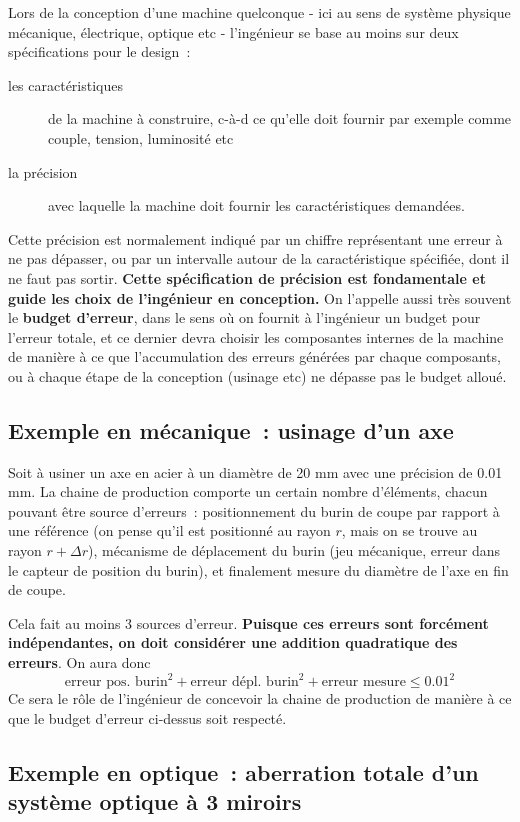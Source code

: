 Lors de la conception d'une machine quelconque - ici au sens de système physique mécanique, électrique, optique etc - l'ingénieur se base au moins sur deux spécifications pour le design~:
\begin{description}
\item[les caractéristiques] de la machine à construire, c-à-d ce qu'elle doit fournir par exemple comme couple, tension, luminosité etc
\item[la précision] avec laquelle la machine doit fournir les caractéristiques demandées.
\end{description}
Cette précision est normalement indiqué par un chiffre représentant une erreur à ne pas dépasser, ou par un intervalle autour de la caractéristique spécifiée, dont il ne faut pas sortir. \textbf{Cette spécification de précision est fondamentale et guide les choix de l'ingénieur en conception.} On l'appelle aussi très souvent le \textbf{budget d'erreur}, dans le sens où on fournit à l'ingénieur un budget pour l'erreur totale, et ce dernier devra choisir les composantes internes de la machine de manière à ce que l'accumulation des erreurs générées par chaque composants, ou à chaque étape de la conception (usinage etc) ne dépasse pas le budget alloué.

\subsection*{Exemple en mécanique~: usinage d'un axe}

Soit à usiner un axe en acier à un diamètre de 20 mm avec une précision de 0.01 mm. La chaine de production comporte un certain nombre d'éléments, chacun pouvant être source d'erreurs~: positionnement du burin de coupe par rapport à une référence (on pense qu'il est positionné au rayon $r$, mais on se trouve au rayon $r+\Delta r$), mécanisme de déplacement du burin (jeu mécanique, erreur dans le capteur de position du burin), et finalement mesure du diamètre de l'axe en fin de coupe.

Cela fait au moins 3 sources d'erreur. \textbf{Puisque ces erreurs sont forcément indépendantes, on doit considérer une addition quadratique des erreurs}. On aura donc
$$
\text{erreur pos. burin}^2+\text{erreur dépl. burin}^2+\text{erreur mesure}\le0.01^2
$$
Ce sera le rôle de l'ingénieur de concevoir la chaine de production de manière à ce que le budget d'erreur ci-dessus soit respecté.

\subsection*{Exemple en optique~: aberration totale d'un système optique à 3 miroirs}

